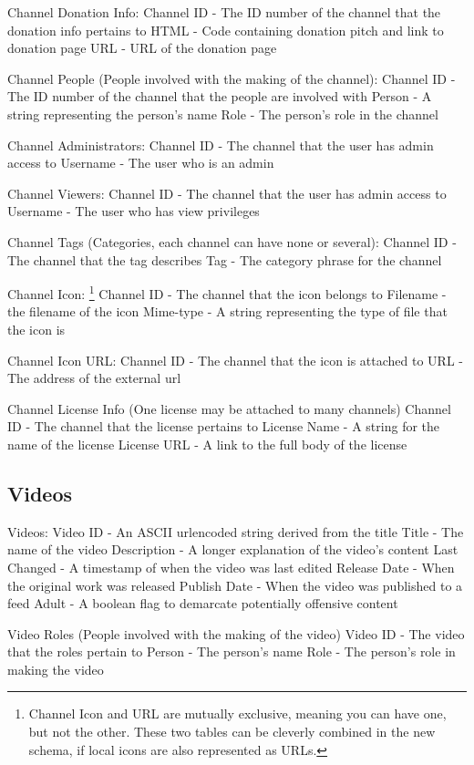 \documentclass[a4paper,12pt]{report}
\begin{document}
Channel Donation Info:
    Channel ID - The ID number of the channel that the donation info pertains to
    HTML - Code containing donation pitch and link to donation page
    URL - URL of the donation page

Channel People (People involved with the making of the channel):
    Channel ID - The ID number of the channel that the people are involved with
    Person - A string representing the person's name
    Role - The person's role in the channel

Channel Administrators:
    Channel ID - The channel that the user has admin access to
    Username - The user who is an admin

Channel Viewers:
    Channel ID - The channel that the user has admin access to
    Username - The user who has view privileges

Channel Tags (Categories, each channel can have none or several):
    Channel ID - The channel that the tag describes
    Tag - The category phrase for the channel

Channel Icon:
\footnote{Channel Icon and URL are mutually exclusive, meaning you can have one, but not the other. These two tables can be cleverly combined in the new schema, if local icons are also represented as URLs.}
    Channel ID - The channel that the icon belongs to
    Filename - the filename of the icon
    Mime-type - A string representing the type of file that the icon is

Channel Icon URL:
    Channel ID - The channel that the icon is attached to
    URL - The address of the external url

Channel License Info (One license may be attached to many channels)
    Channel ID - The channel that the license pertains to
    License Name - A string for the name of the license
    License URL - A link to the full body of the license

\subsection{Videos}
Videos:
    Video ID - An ASCII urlencoded string derived from the title
    Title - The name of the video
    Description - A longer explanation of the video's content
    Last Changed - A timestamp of when the video was last edited
    Release Date - When the original work was released
    Publish Date - When the video was published to a feed
    Adult - A boolean flag to demarcate potentially offensive content    

Video Roles (People involved with the making of the video)
    Video ID - The video that the roles pertain to
    Person - The person's name
    Role - The person's role in making the video
\end{document}
